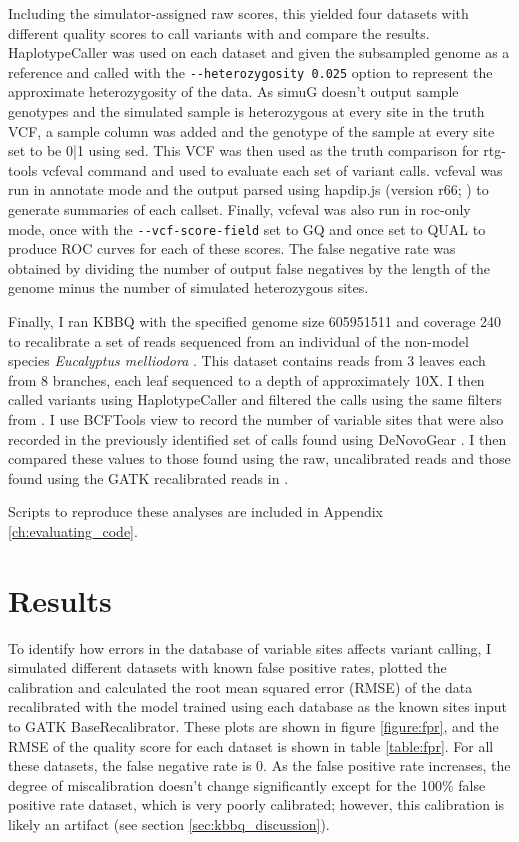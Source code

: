 Including the simulator-assigned raw scores, this yielded four datasets with different quality scores to call variants with and compare the results. HaplotypeCaller was used on each dataset and given the subsampled genome as a reference and called with the \texttt{-\phantom{}-heterozygosity 0.025} option to represent the approximate heterozygosity of the data. As simuG doesn't output sample genotypes and the simulated sample is heterozygous at every site in the truth VCF, a sample column was added and the genotype of the sample at every site set to be 0|1 using sed. This VCF was then used as the truth comparison for rtg-tools vcfeval command and used to evaluate each set of variant calls. vcfeval was run in annotate mode and the output parsed using hapdip.js (version r66; \cite{li_toward_2014}) to generate summaries of each callset. Finally, vcfeval was also run in roc-only mode, once with the \verb|--vcf-score-field| set to GQ and once set to QUAL to produce ROC curves for each of these scores. The false negative rate was obtained by dividing the number of output false negatives by the length of the genome minus the number of simulated heterozygous sites.

Finally, I ran KBBQ with the specified genome size 605951511 and coverage 240 to recalibrate a set of reads sequenced from an individual of the non-model species \textit{Eucalyptus melliodora} \parencite{orr_phylogenomic_2020}. This dataset contains reads from 3 leaves each from 8 branches, each leaf sequenced to a depth of approximately 10X. I then called variants using HaplotypeCaller and filtered the calls using the same filters from \textcite{orr_phylogenomic_2020}. I use BCFTools view to record the number of variable sites that were also recorded in the previously identified set of calls found using DeNovoGear \parencite{ramu_denovogear_2013}. I then compared these values to those found using the raw, uncalibrated reads and those found using the GATK recalibrated reads in \textcite{orr_phylogenomic_2020}.

Scripts to reproduce these analyses are included in Appendix \ref{ch:evaluating_code}.

\section{Results}
To identify how errors in the database of variable sites affects variant calling, I simulated different datasets with known false positive rates, plotted the calibration and calculated the root mean squared error (RMSE) of the data recalibrated with the model trained using each database as the known sites input to GATK BaseRecalibrator. These plots are shown in figure \ref{figure:fpr}, and the RMSE of the quality score for each dataset is shown in table \ref{table:fpr}. For all these datasets, the false negative rate is 0. As the false positive rate increases, the degree of miscalibration doesn't change significantly except for the 100\% false positive rate dataset, which is very poorly calibrated; however, this calibration is likely an artifact (see section \ref{sec:kbbq_discussion}).

